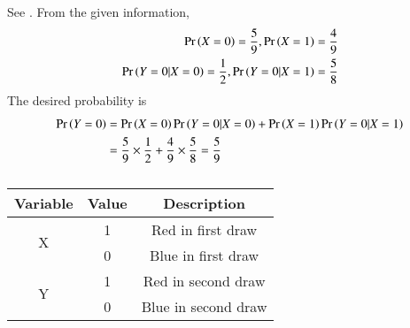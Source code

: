     See .
    From the given information,
\begin{align}
    \Pr\left(X = 0\right) = \frac{5}{9},
    \Pr\left(X = 1\right) = \frac{4}{9}
    \\
    \Pr\left(Y = 0 | X = 0\right) =  \frac{1}{2},
    \Pr\left(Y = 0 | X = 1\right) =  \frac{5}{8}
\end{align}
The desired probability is
\begin{align}
\Pr\left(Y = 0\right) &= \Pr\left(X = 0\right)\Pr\left(Y = 0 | X = 0\right) + \Pr\left(X = 1\right)\Pr\left(Y = 0 | X = 1\right)\\
           &= {\frac{5}{9}}\times{\frac{1}{2}} + {\frac{4}{9}}\times{{\frac{5}{8}}}
           = \frac{5}{9}
\end{align}
\begin{table}[H]
    \centering
    \caption{}
    \label{table:draw-colour}
%
    \begin{tabular}{|c|c|c|}
\hline
Variable & Value & Description       \\
\hline
\multirow{2}{*}{X} & 1     & Red in first draw\\ 
\cline{2-3}
                   & 0     & Blue in first draw\\
\hline
\multirow{2}{*}{Y} & 1     & Red in second draw\\ 
\cline{2-3}
                   & 0     & Blue in second draw\\
\hline
\end{tabular}
%
\end{table}
